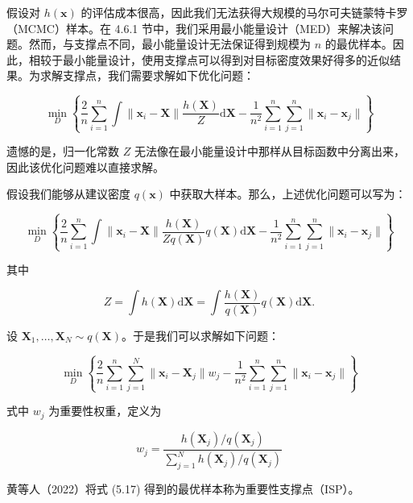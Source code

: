 \documentclass{ctexart}
\begin{document}
假设对 $h(\boldsymbol{x})$ 的评估成本很高，因此我们无法获得大规模的马尔可夫链蒙特卡罗（MCMC）样本。在 4.6.1 节中，我们采用最小能量设计（MED）来解决该问题。然而，与支撑点不同，最小能量设计无法保证得到规模为 $n$ 的最优样本。因此，相较于最小能量设计，使用支撑点可以得到对目标密度效果好得多的近似结果。为求解支撑点，我们需要求解如下优化问题：

\begin{equation*}
\min_{D}\left\{\frac{2}{n}\sum_{i=1}^{n}\int \|\boldsymbol{x}_i-\boldsymbol{X}\|\frac{h(\boldsymbol{X})}{Z}\mathrm{d}\boldsymbol{X}-\frac{1}{n^2}\sum_{i=1}^{n}\sum_{j=1}^{n}\|\boldsymbol{x}_i-\boldsymbol{x}_j\|\right\}
\end{equation*}

遗憾的是，归一化常数 $Z$ 无法像在最小能量设计中那样从目标函数中分离出来，因此该优化问题难以直接求解。

假设我们能够从建议密度 $q(\boldsymbol{x})$ 中获取大样本。那么，上述优化问题可以写为：

\begin{equation*}
\min_{D}\left\{\frac{2}{n}\sum_{i=1}^{n}\int \|\boldsymbol{x}_i-\boldsymbol{X}\|\frac{h(\boldsymbol{X})}{Zq(\boldsymbol{X})}q(\boldsymbol{X})\mathrm{d}\boldsymbol{X}-\frac{1}{n^2}\sum_{i=1}^{n}\sum_{j=1}^{n}\|\boldsymbol{x}_i-\boldsymbol{x}_j\|\right\}
\end{equation*}

其中

\begin{equation*}
Z=\int h(\boldsymbol{X})\mathrm{d}\boldsymbol{X}=\int\frac{h(\boldsymbol{X})}{q(\boldsymbol{X})}q(\boldsymbol{X})\mathrm{d}\boldsymbol{X}.
\end{equation*}

设 $\boldsymbol{X}_1,\dots,\boldsymbol{X}_N \sim q(\boldsymbol{X})$。于是我们可以求解如下问题：

\begin{equation*}
\min_{D}\left\{\frac{2}{n}\sum_{i=1}^{n}\sum_{j=1}^{N}\|\boldsymbol{x}_i-\boldsymbol{X}_j\|w_j-\frac{1}{n^2}\sum_{i=1}^{n}\sum_{j=1}^{n}\|\boldsymbol{x}_i-\boldsymbol{x}_j\|\right\}
\tag{5.17}
\end{equation*}

式中 $w_j$ 为重要性权重，定义为

\begin{equation*}
w_j=\frac{h(\boldsymbol{X}_j)/q(\boldsymbol{X}_j)}{\sum_{j=1}^{N}h(\boldsymbol{X}_j)/q(\boldsymbol{X}_j)}
\end{equation*}

黄等人（2022）将式 (5.17) 得到的最优样本称为重要性支撑点（ISP）。
\end{document}
